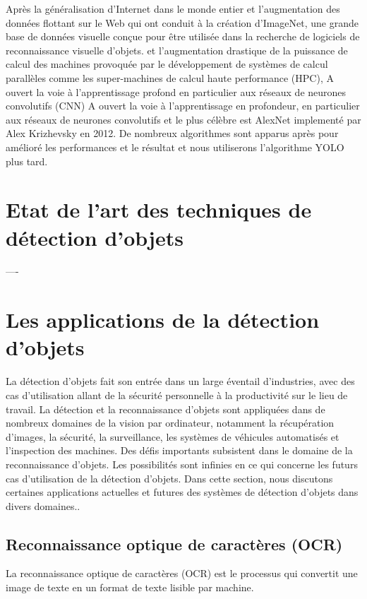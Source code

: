 Après la généralisation d'Internet dans le monde entier et l'augmentation des données flottant sur le Web qui ont conduit à la création d'ImageNet, une grande base de données visuelle conçue pour être utilisée dans la recherche de logiciels de reconnaissance visuelle d'objets. et l'augmentation drastique de la puissance de calcul des machines provoquée par le développement de systèmes de calcul parallèles comme les super-machines de calcul haute performance (HPC), A ouvert la voie à l'apprentissage profond en particulier aux réseaux de neurones convolutifs (CNN) A ouvert la voie à l'apprentissage en profondeur, en particulier aux réseaux de neurones
convolutifs et le plus célèbre est AlexNet implementé par Alex Krizhevsky en 2012. De nombreux algorithmes sont apparus après pour amélioré les performances et le résultat et nous utiliserons l'algorithme YOLO plus tard.
\section{Etat de l'art des techniques de détection d'objets}

----

\section{Les applications de la détection d'objets}
La détection d'objets fait son entrée dans un large éventail d'industries, avec des cas d'utilisation allant de la sécurité personnelle à la productivité sur le lieu de travail. La détection et la reconnaissance d'objets sont appliquées dans de nombreux domaines de la vision par ordinateur, notamment la récupération d'images, la sécurité, la surveillance, les systèmes de véhicules automatisés et l'inspection des machines. Des défis importants subsistent dans le domaine de la reconnaissance d'objets. Les possibilités sont infinies en ce qui concerne les futurs cas d'utilisation de la détection d'objets. Dans cette section, nous discutons  certaines applications actuelles et futures  des systèmes de détection d'objets dans divers domaines..
     \subsection{Reconnaissance optique de caractères (OCR)}
     La reconnaissance optique de caractères (OCR) est le processus qui convertit une image de texte en un format de texte lisible par machine.

